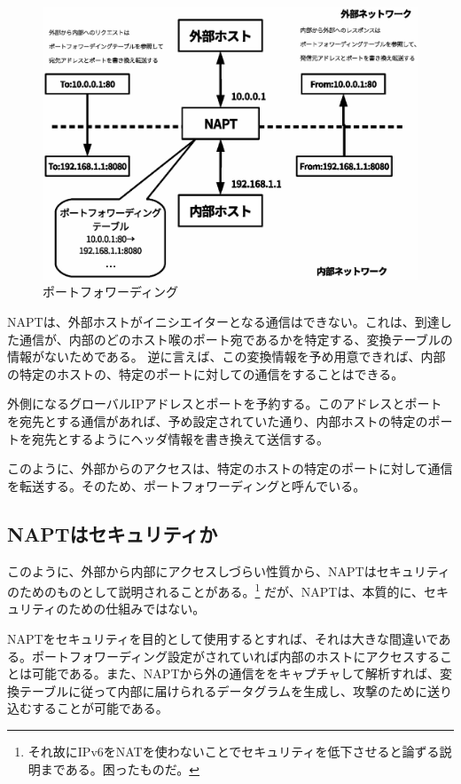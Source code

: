 \begin{figure}[htbp]
	\includegraphics[width=12cm,clip]{draw/fig10.eps}
	\caption{ポートフォワーディング}
	\label{fig:port-forward}
\end{figure}

NAPTは、外部ホストがイニシエイターとなる通信はできない。これは、到達した通信が、内部のどのホスト喉のポート宛であるかを特定する、変換テーブルの情報がないためである。
逆に言えば、この変換情報を予め用意できれば、内部の特定のホストの、特定のポートに対しての通信をすることはできる。

外側になるグローバルIPアドレスとポートを予約する。このアドレスとポートを宛先とする通信があれば、予め設定されていた通り、内部ホストの特定のポートを宛先とするようにヘッダ情報を書き換えて送信する。

このように、外部からのアクセスは、特定のホストの特定のポートに対して通信を転送する。そのため、ポートフォワーディングと呼んでいる。

\subsection{NAPTはセキュリティか}
このように、外部から内部にアクセスしづらい性質から、NAPTはセキュリティのためのものとして説明されることがある。\footnote{それ故にIPv6をNATを使わないことでセキュリティを低下させると論ずる説明まである。困ったものだ。}
だが、NAPTは、本質的に、セキュリティのための仕組みではない。

NAPTをセキュリティを目的として使用するとすれば、それは大きな間違いである。ポートフォワーディング設定がされていれば内部のホストにアクセスすることは可能である。また、NAPTから外の通信ををキャプチャして解析すれば、変換テーブルに従って内部に届けられるデータグラムを生成し、攻撃のために送り込むすることが可能である。

